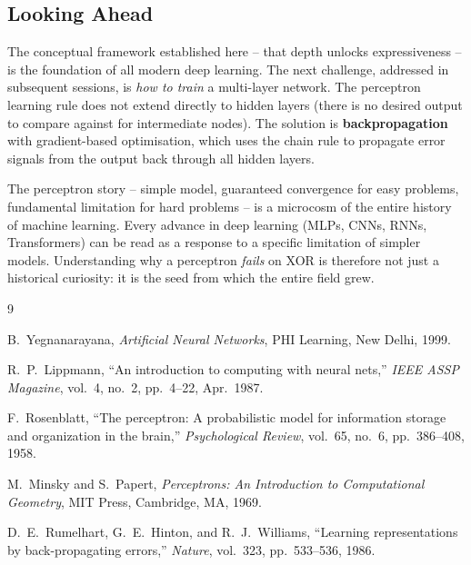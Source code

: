 \documentclass[12pt,a4paper]{article}
\begin{document}
\subsection{Looking Ahead}
\label{subsec:ahead}

The conceptual framework established here -- that depth unlocks
expressiveness -- is the foundation of all modern deep learning.  The
next challenge, addressed in subsequent sessions, is \emph{how to train}
a multi-layer network.  The perceptron learning rule does not extend
directly to hidden layers (there is no desired output to compare against
for intermediate nodes).  The solution is \textbf{backpropagation} with
gradient-based optimisation, which uses the chain rule to propagate error
signals from the output back through all hidden layers.

\begin{keyinsight}[title=Key Insight -- The Road from Perceptron to Deep Learning]
The perceptron story -- simple model, guaranteed convergence for easy
problems, fundamental limitation for hard problems -- is a microcosm of
the entire history of machine learning.  Every advance in deep learning
(MLPs, CNNs, RNNs, Transformers) can be read as a response to a specific
limitation of simpler models.  Understanding why a perceptron \emph{fails}
on XOR is therefore not just a historical curiosity: it is the seed from
which the entire field grew.
\end{keyinsight}

\newpage
\begin{thebibliography}{9}

B.~Yegnanarayana,
\textit{Artificial Neural Networks},
PHI Learning, New Delhi, 1999.

R.~P.~Lippmann,
``An introduction to computing with neural nets,''
\textit{IEEE ASSP Magazine}, vol.~4, no.~2, pp.~4--22, Apr.~1987.

F.~Rosenblatt,
``The perceptron: A probabilistic model for information storage and
organization in the brain,''
\textit{Psychological Review}, vol.~65, no.~6, pp.~386--408, 1958.

M.~Minsky and S.~Papert,
\textit{Perceptrons: An Introduction to Computational Geometry},
MIT Press, Cambridge, MA, 1969.

D.~E.~Rumelhart, G.~E.~Hinton, and R.~J.~Williams,
``Learning representations by back-propagating errors,''
\textit{Nature}, vol.~323, pp.~533--536, 1986.

\end{thebibliography}
\end{document}
